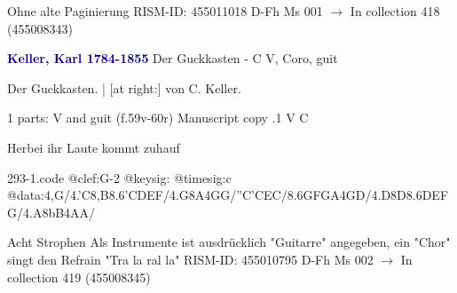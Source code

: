 \documentclass[twocolumn]{book}
\begin{document}
\newline Ohne alte Paginierung
\newline RISM-ID: 455011018
\newline D-Fh  Ms 001
\newline $\rightarrow$ In collection 418 (455008343)
      
\newline \par \vspace{7pt} \textcolor{darkblue}{\textbf{Keller, Karl  1784-1855}}
\newline Der Guckkasten - C
\newline V, Coro, guit
\newline \begin{itshape}[heading, f.59v:] Der Guckkasten. | [at right:] von C. Keller.\end{itshape} 
\newline \textcolor{darkblue}{}  1 parts: V and guit  (f.59v-60r)
\newline Manuscript copy
.1  V  C
\newline \begin{footnotesize} Herbei ihr Laute kommt zuhauf \end{footnotesize}  
\begin{filecontents*}{293-1.code}
@clef:G-2
@keysig:
@timesig:c
@data:4,G/4.'C8,B{8.6'CD}{EF}/4.G8A4GG/''C'CEC/8.6{GF}GA4GD/4.D8D{8.6DE}{FG}/4.A8bB4AA/
\end{filecontents*}
\newline
%

\newline Acht Strophen
\newline Als Instrumente ist ausdrücklich "Guitarre" angegeben, ein "Chor" singt den Refrain "Tra la ral la"
\newline RISM-ID: 455010795
\newline D-Fh  Ms 002
\newline $\rightarrow$ In collection 419 (455008345)
      
\end{document}

